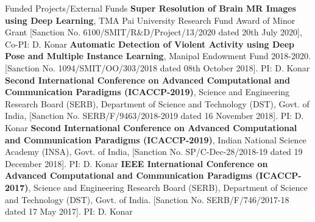 \begin{rubric}{Funded Projects/External Funds}
 \textbf{Super Resolution of Brain MR Images using Deep Learning}, TMA Pai University Research Fund Award of Minor Grant [Sanction No. 6100/SMIT/R\&D/Project/13/2020 dated 20th July 2020], 
Co-PI: D. Konar
 \textbf{Automatic Detection of Violent Activity using Deep Pose and Multiple Instance Learning}, Manipal Endowment Fund 2018-2020. [Sanction No. 1094/SMIT/OO/303/2018 dated 08th October 2018].
PI: D. Konar
 \textbf{Second International Conference on Advanced Computational and Communication Paradigms (ICACCP-2019)}, Science and Engineering Research Board (SERB), Department of Science and Technology (DST), Govt. of India, [Sanction No. SERB/F/9463/2018-2019 dated 16 November 2018].  
PI: D. Konar
 \textbf{Second International Conference on Advanced Computational and Communication Paradigms (ICACCP-2019)}, Indian National Science Academy (INSA), Govt. of India, [Sanction No. SP/C-Dec-28/2018-19 dated 19 December 2018].
PI: D. Konar  
 \textbf{IEEE International Conference on Advanced Computational and Communication Paradigms (ICACCP-2017)}, Science and Engineering Research Board (SERB), Department of Science and Technology (DST), Govt. of India. [Sanction No. SERB/F/746/2017-18 dated 17 May 2017].
PI: D. Konar
\end{rubric}